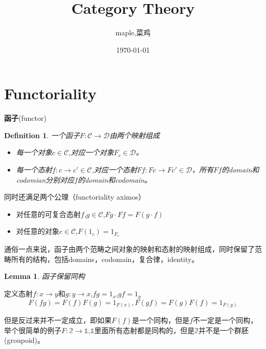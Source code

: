 \documentclass[UTF8,11pt,a4paper]{ctexart}
\title{Category Theory}
\author{maple,菜鸡}
\date{\today}
\newtheorem{lemma}[theorem]{Lemma}
\newtheorem{definition}[theorem]{Definition}
\newcommand*{\xfunc}[4]{{#2}\colon{#3}{#1}{#4}}
\newcommand*{\func}[3]{\xfunc{\to}{#1}{#2}{#3}}
\begin{document}
\maketitle
\tableofcontents

\section{Functoriality}

\begin{flushleft}
\textbf{函子}(functor)\\
\begin{definition}
一个函子$F \colon \mathcal{C} \rightarrow \mathcal{D}$由两个映射组成
\begin{itemize}
 \item 每一个对象$c \in \mathcal{C}$,对应一个对象$F_c \in \mathcal{D}$。
 \item 每一个态射$f \colon c \rightarrow	c' \in \mathcal{C}$,对应一个态射$Ff \colon Fc \rightarrow Fc' \in \mathcal{D}$，所有$Ff$的domain和codomian分别对应$f$的domain和codomain。 
\end{itemize}
\end{definition}
同时还满足两个公理（functoriality aximos）
\begin{itemize}
 	\item 对任意的可复合态射$f$,$g \in \mathcal{C}$,$Fg \cdot Ff = F(g \cdot f)$
 	\item 对任意的对象$c \in \mathcal{C}$,$F(1_c)=1_{F_c}$
\end{itemize}
通俗一点来说，函子由两个范畴之间对象的映射和态射的映射组成，同时保留了范畴所有的结构，包括domains，codomain，复合律，identity。
\end{flushleft}

\begin{lemma}
函子保留同构
\end{lemma}

定义态射$\func{f}{x}{y}$和$\func{g}{y}{x}$,$fg = 1_x$,$gf=1_y$ \[F(fg)=F(f)F(g)=1_{F(x)} , F(gf)=F(g)F(f)=1_{F(y)}\]

但是反过来并不一定成立，即如果$F(f)$是一个同构，但是$f$不一定是一个同构，举个很简单的例子$\func{F}{\mathbb{2}}{\mathbb{1}}$,$\mathbb{1}$里面所有态射都是同构的，但是$\mathbb{2}$并不是一个群胚(groupoid)。
\pagebreak
\end{document}
